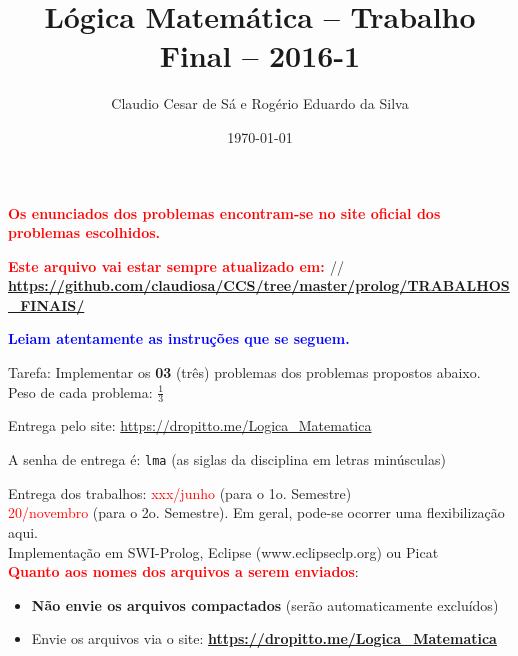 \documentclass[a4paper,12pt]{article}
\title{Lógica Matemática -- Trabalho Final -- 2016-1}
\author{Claudio Cesar de Sá e Rogério Eduardo da Silva}
\date{\today}
\begin{document}
\maketitle

\begin{flushleft}


\vspace{0.5cm}
  {\bf \textcolor{red}{Os enunciados dos problemas encontram-se no site oficial dos problemas escolhidos.}}


\vspace{0.5cm}
  {\bf \textcolor{red}{Este arquivo vai estar sempre atualizado em: }}//
{\bf \textcolor{red}{\url{https://github.com/claudiosa/CCS/tree/master/prolog/TRABALHOS_FINAIS/}}}



\vspace{0.5cm}
 {\bf \textcolor{blue}{Leiam atentamente as
instruções que se seguem.}}


\vspace{0.5cm}
 Tarefa: Implementar os  \textbf{03} (três)  problemas dos problemas propostos abaixo. 
Peso de cada problema: $\frac{1}{3}$


\vspace{0.5cm}
 Entrega pelo site: \textcolor{red}{\url{https://dropitto.me/Logica_Matematica}}

\vspace{0.5cm}
 A senha de entrega  é: \texttt{lma} (as siglas da disciplina em letras minúsculas)

\vspace{0.5cm}
 Entrega dos trabalhos: \textcolor{red}{xxx/junho} (para o 1o. Semestre)\\
\textcolor{red}{20/novembro} (para o 2o. Semestre). Em geral, pode-se
ocorrer uma flexibilização aqui.\\



\vspace{0.5cm}
 Implementação em SWI-Prolog, Eclipse (www.eclipseclp.org) ou Picat\\

\vspace{0.5cm}
 \textcolor{red}{\textbf{Quanto aos nomes dos arquivos a serem enviados}}:
\begin{itemize}
  \item \textbf{Não envie os arquivos compactados} (serão automaticamente excluídos)
  \item Envie os arquivos  via o site: \textbf{ \url{https://dropitto.me/Logica_Matematica}}


\end{itemize}
\end{flushleft}
\end{document}
